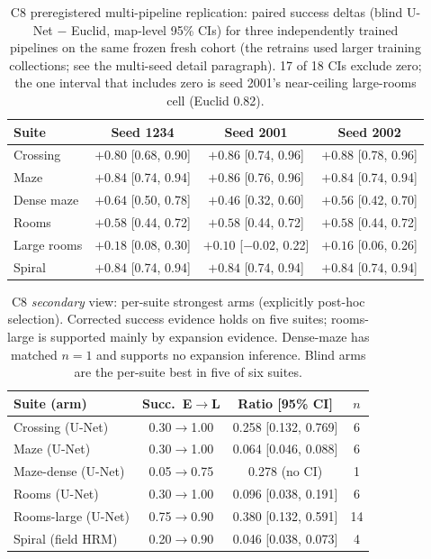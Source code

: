 \documentclass[letterpaper]{article} %
\newcommand{\stage}[1]{\textsc{#1}}
\begin{document}
\begin{table}[t]
\centering
\small
\setlength{\tabcolsep}{2.6pt}
\begin{tabular}{@{}lccc@{}}
\toprule
Suite & Seed 1234 & Seed 2001 & Seed 2002 \\
\midrule
Crossing & $+0.80$ [0.68, 0.90] & $+0.86$ [0.74, 0.96] & $+0.88$ [0.78, 0.96] \\
Maze & $+0.84$ [0.74, 0.94] & $+0.86$ [0.76, 0.96] & $+0.84$ [0.74, 0.94] \\
Dense maze & $+0.64$ [0.50, 0.78] & $+0.46$ [0.32, 0.60] & $+0.56$ [0.42, 0.70] \\
Rooms & $+0.58$ [0.44, 0.72] & $+0.58$ [0.44, 0.72] & $+0.58$ [0.44, 0.72] \\
Large rooms & $+0.18$ [0.08, 0.30] & $+0.10$ [$-$0.02, 0.22] & $+0.16$ [0.06, 0.26] \\
Spiral & $+0.84$ [0.74, 0.94] & $+0.84$ [0.74, 0.94] & $+0.84$ [0.74, 0.94] \\
\bottomrule
\end{tabular}
\caption{\stage{C8} preregistered multi-pipeline replication: paired success deltas (blind U-Net $-$ Euclid, map-level 95\% CIs) for three independently trained pipelines on the same frozen fresh cohort (the retrains used larger training collections; see the multi-seed detail paragraph). 17 of 18 CIs exclude zero; the one interval that includes zero is seed 2001's near-ceiling large-rooms cell (Euclid 0.82).}
\label{tab:c8seeds}
\end{table}

\begin{table}[t]
\centering
\small
\setlength{\tabcolsep}{3pt}
\begin{tabular}{@{}lccc@{}}
\toprule
Suite (arm) & Succ.\ E$\to$L & Ratio [95\% CI] & $n$ \\
\midrule
Crossing (U-Net) & 0.30$\to$1.00 & 0.258 [0.132, 0.769] & 6 \\
Maze (U-Net) & 0.30$\to$1.00 & 0.064 [0.046, 0.088] & 6 \\
Maze-dense (U-Net) & 0.05$\to$0.75 & 0.278 (no CI) & 1 \\
Rooms (U-Net) & 0.30$\to$1.00 & 0.096 [0.038, 0.191] & 6 \\
Rooms-large (U-Net) & 0.75$\to$0.90 & 0.380 [0.132, 0.591] & 14 \\
Spiral (field HRM) & 0.20$\to$0.90 & 0.046 [0.038, 0.073] & 4 \\
\bottomrule
\end{tabular}
\caption{\stage{C8} \emph{secondary} view: per-suite strongest arms (explicitly post-hoc selection). Corrected success evidence holds on five suites; rooms-large is supported mainly by expansion evidence. Dense-maze has matched $n{=}1$ and supports no expansion inference. Blind arms are the per-suite best in five of six suites.}
\label{tab:c8}
\end{table}
\end{document}
